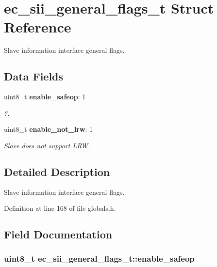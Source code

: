 \section{ec\-\_\-sii\-\_\-general\-\_\-flags\-\_\-t Struct Reference}
\label{structec__sii__general__flags__t}


Slave information interface general flags.  


\subsection*{Data Fields}
\begin{DoxyCompactItemize}
\item 
uint8\-\_\-t {\bf enable\-\_\-safeop}\-: 1
\begin{DoxyCompactList}\small\item\em ?. \end{DoxyCompactList}\item 
uint8\-\_\-t {\bf enable\-\_\-not\-\_\-lrw}\-: 1
\begin{DoxyCompactList}\small\item\em Slave does not support L\-R\-W. \end{DoxyCompactList}\end{DoxyCompactItemize}


\subsection{Detailed Description}
Slave information interface general flags. 

Definition at line 168 of file globals.\-h.



\subsection{Field Documentation}
\subsubsection[{enable\-\_\-safeop}]{\setlength{\rightskip}{0pt plus 5cm}uint8\-\_\-t ec\-\_\-sii\-\_\-general\-\_\-flags\-\_\-t\-::enable\-\_\-safeop}\label{structec__sii__general__flags__t_a06c42cdbd02ae8d4029d72db27a43ade}


